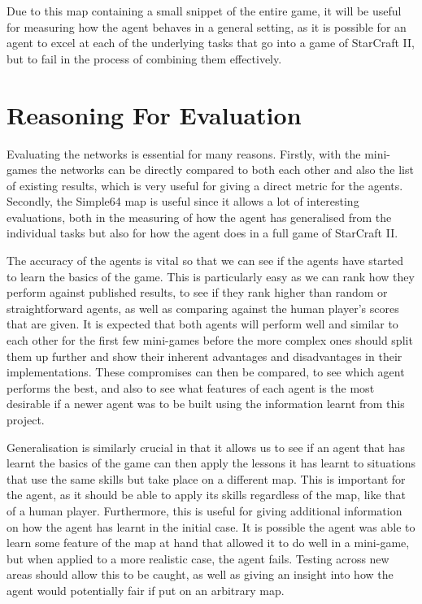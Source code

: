 Due to this map containing a small snippet of the entire game, it will be useful
for measuring how the agent behaves in a general setting, as it is possible for
an agent to excel at each of the underlying tasks that go into a game of
StarCraft II, but to fail in the process of combining them effectively.

\section{Reasoning For Evaluation}

Evaluating the networks is essential for many reasons. Firstly, with the
mini-games the networks can be directly compared to both each other and also the
list of existing results, which is very useful for giving a direct metric for
the agents. Secondly, the Simple64 map is useful since it allows a lot of
interesting evaluations, both in the measuring of how the agent has generalised
from the individual tasks but also for how the agent does in a full game of
StarCraft II\@.

The accuracy of the agents is vital so that we can see if the agents have
started to learn the basics of the game. This is particularly easy as we can
rank how they perform against published results, to see if they rank higher than
random or straightforward agents, as well as comparing against the human
player's scores that are given. It is expected that both agents will perform
well and similar to each other for the first few mini-games before the more
complex ones should split them up further and show their inherent advantages and
disadvantages in their implementations. These compromises can then be compared,
to see which agent performs the best, and also to see what features of each
agent is the most desirable if a newer agent was to be built using the
information learnt from this project.

Generalisation is similarly crucial in that it allows us to see if an agent that
has learnt the basics of the game can then apply the lessons it has learnt to
situations that use the same skills but take place on a different map. This is
important for the agent, as it should be able to apply its skills regardless of
the map, like that of a human player. Furthermore, this is useful for giving
additional information on how the agent has learnt in the initial case. It is
possible the agent was able to learn some feature of the map at hand that
allowed it to do well in a mini-game, but when applied to a more realistic case,
the agent fails. Testing across new areas should allow this to be caught, as
well as giving an insight into how the agent would potentially fair if put on an
arbitrary map.

